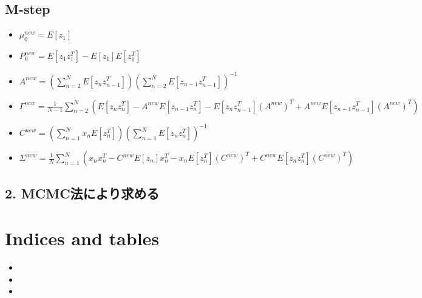 \documentclass[letterpaper,10pt,dvipdfmx]{sphinxmanual}
\begin{document}
\section{M-step}
\label{docs/estimate_parameter:m-step}\begin{itemize}
\item {} 
\(\mu_{0}^{new} = E[z_{1}]\)

\item {} 
\(P_{0}^{new} = E[z_{1} z_{1}^{T}] - E[z_{1}]E[z_{1}^{T}]\)

\item {} 
\(A^{new} =(\sum_{n=2}^{N} E[z_{n} z_{n-1}^{T}])(\sum_{n=2}^{N} E[z_{n-1} z_{n-1}^{T}])^{-1}\)

\item {} 
\(\Gamma^{new} = \frac{1}{N-1} \sum_{n=2}^{N}(E[z_{n}z_{n}^{T}] - A ^{new} E[z_{n-1}z_{n}^{T}]-E[z_{n} z_{n-1}^{T}](A^{new})^{T} + A^{new} E[z_{n-1} z_{n-1}^{T}](A^{new})^{T})\)

\item {} 
\(C^{new} = (\sum_{n=1}^{N}x_{n}E[z_{n}^{T}])(\sum_{n=1}^{N}E[z_{n}z_{n}^{T}])^{-1}\)

\item {} 
\(\Sigma^{new} = \frac{1}{N} \sum_{n=1}^{N} (x_{n}x_{n}^{T} -C^{new} E[z_{n}]x_{n}^{T} -x_{n}E[z_{n}^{T}](C^{new})^{T}+C^{new}E[z_{n}z_{n}^{T}](C^{new})^{T})\)

\end{itemize}


\section{2. MCMC法により求める}
\label{docs/estimate_parameter:mcmc}

\chapter{Indices and tables}
\label{index:indices-and-tables}\begin{itemize}
\item {} 

\item {} 

\item {} 

\end{itemize}



\renewcommand{\indexname}{索引}
\printindex
\end{document}
